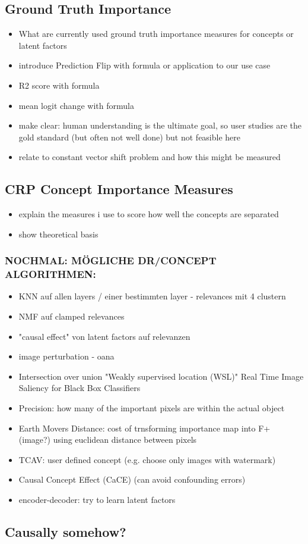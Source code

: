 \subsection{Ground Truth Importance}
\begin{itemize}
    \item What are currently used ground truth importance measures for concepts or latent factors
    \item introduce Prediction Flip with formula or application to our use case
    \item R2 score with formula \cite{Sixt2020}
    \item mean logit change with formula
    \item make clear: human understanding is the ultimate goal, so user studies are the gold standard (but often not well done) but not feasible here
    \item relate to constant vector shift problem and how this might be measured
\end{itemize}
\subsection{CRP Concept Importance Measures}
\begin{itemize}
    \item explain the measures i use to score how well the concepts are separated
    \item show theoretical basis
\end{itemize}

\subsubsection*{NOCHMAL: MÖGLICHE DR/CONCEPT ALGORITHMEN:}
\begin{itemize}
    \item KNN auf allen layers / einer bestimmten layer - relevances mit 4 clustern
    \item NMF auf clamped relevances
    \item "causal effect" von latent factors auf relevanzen
    \item image perturbation - oana
    \item Intersection over union "Weakly supervised location (WSL)" Real Time Image Saliency for Black Box Classifiers
    \item Precision: how many of the important pixels are within the actual object
    \item Earth Movers Distance: cost of trnsforming importance map into F+ (image?) using euclidean distance between pixels
    \item TCAV: user defined concept (e.g. choose only images with watermark) 
    \item Causal Concept Effect (CaCE) (can avoid confounding errors) 
    \item encoder-decoder: try to learn latent factors 
\end{itemize}


\subsection{Causally somehow? }